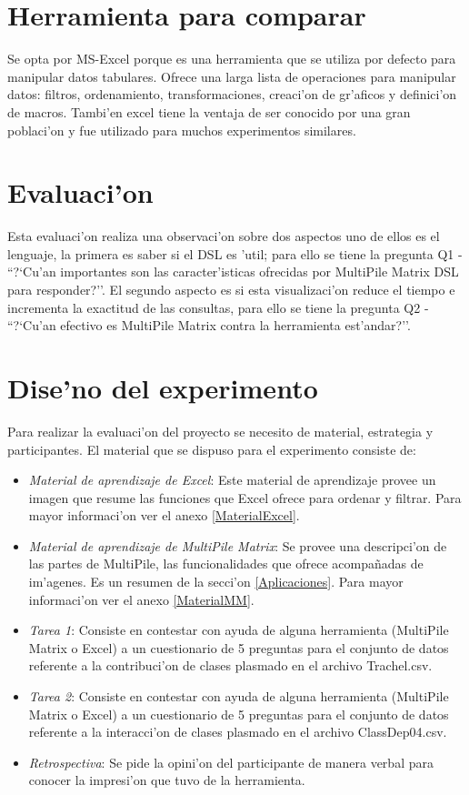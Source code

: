 \section{Herramienta para comparar}
Se opta por MS-Excel porque es una herramienta que se utiliza por defecto para manipular datos tabulares. Ofrece una larga lista de operaciones para manipular datos: filtros, ordenamiento, transformaciones, creaci'on de gr'aficos y definici'on de macros. Tambi'en excel tiene la ventaja de ser conocido por una gran poblaci'on y fue utilizado para muchos experimentos similares\cite{Cube14}.

\section{Evaluaci'on}
Esta evaluaci'on realiza una observaci'on sobre dos aspectos uno de ellos es el lenguaje, la primera es saber si el DSL es 'util; para ello se tiene la pregunta Q1 - ``?`Cu'an importantes son las caracter'isticas ofrecidas por MultiPile Matrix DSL para responder?''. El segundo aspecto es si esta visualizaci'on reduce el tiempo e incrementa la exactitud de las consultas, para ello se tiene la pregunta Q2 - ``?`Cu'an efectivo es MultiPile Matrix contra la herramienta est'andar?''.

\section{Dise'no del experimento}
Para realizar la evaluaci'on del proyecto se necesito de material, estrategia y participantes. El material que se dispuso para el experimento consiste de:
\begin{itemize}
\item \emph{Material de aprendizaje de Excel}: Este material de aprendizaje provee un imagen que resume las funciones que Excel ofrece para ordenar y filtrar. Para mayor informaci'on ver el anexo \ref{MaterialExcel}.
\item \emph{Material de aprendizaje de MultiPile Matrix}: Se provee una descripci'on de las partes de MultiPile, las funcionalidades que ofrece acompa\~{n}adas de im'agenes. Es un resumen de la secci'on \ref{Aplicaciones}. Para mayor informaci'on ver el anexo \ref{MaterialMM}.
\item \emph{Tarea 1}: Consiste en contestar con ayuda de alguna herramienta (MultiPile Matrix o Excel) a un cuestionario de 5 preguntas para el conjunto de datos referente a la contribuci'on de clases plasmado en el archivo Trachel.csv.
\item \emph{Tarea 2}: Consiste en contestar con ayuda de alguna herramienta (MultiPile Matrix o Excel) a un cuestionario de 5 preguntas para el conjunto de datos referente a la interacci'on de clases plasmado en el archivo ClassDep04.csv.
\item \emph{Retrospectiva}: Se pide la opini'on del participante de manera verbal para conocer la impresi'on que tuvo de la herramienta.
\end{itemize}

